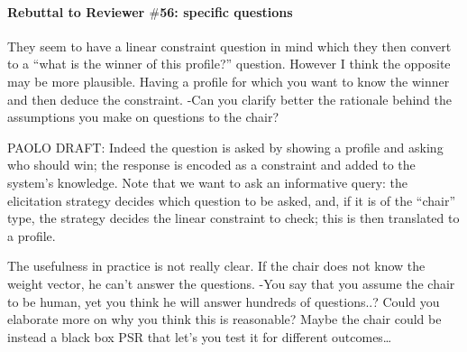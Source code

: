 \documentclass{article}
\begin{document}
\paragraph{Rebuttal to Reviewer $\#$56: specific questions}

They seem to have a linear constraint question in mind which they then convert to a “what is the winner of this profile?” question. However I think the opposite may be more plausible. Having a profile for which you want to know the winner and then deduce the constraint.
-Can you clarify better the rationale behind the assumptions you make on questions to the chair?

PAOLO DRAFT: Indeed the question is asked by showing a profile and asking who should win; the response is encoded as a constraint and added to the system’s knowledge. Note that we want to ask an informative query: the elicitation strategy decides which question to be asked, and, if it is of the “chair” type, the strategy decides the linear constraint to check; this is then translated to a profile.

The usefulness in practice is not really clear. If the chair does not know the weight vector, he can’t answer the questions.
-You say that you assume the chair to be human, yet you think he will answer hundreds of questions..? Could you elaborate more on why you think this is reasonable?
Maybe the chair could be instead a black box PSR that let’s you test it for different outcomes…
\end{document}
